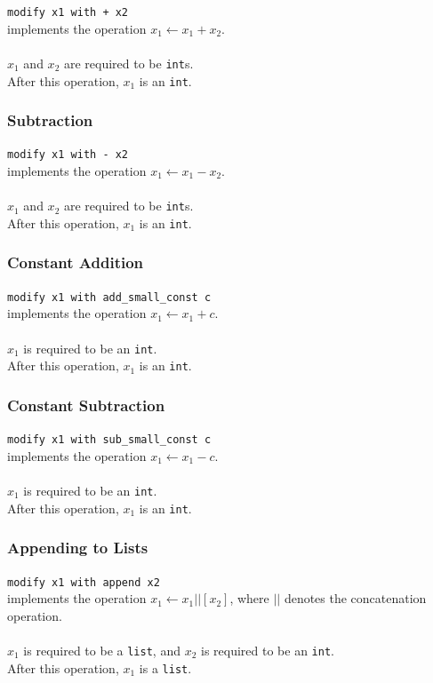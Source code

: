 \texttt{modify x1 with + x2} \\
implements the operation $x_1 \leftarrow x_1 + x_2$. \\ \\
$x_1$ and $x_2$ are required to be \texttt{int}s. \\
After this operation, $x_1$ is an \texttt{int}.

\subsubsection{Subtraction}

\texttt{modify x1 with - x2} \\
implements the operation $x_1 \leftarrow x_1 - x_2$. \\ \\
$x_1$ and $x_2$ are required to be \texttt{int}s. \\
After this operation, $x_1$ is an \texttt{int}.

\subsubsection{Constant Addition}

\texttt{modify x1 with add\_small\_const c} \\
implements the operation $x_1 \leftarrow x_1 + c$. \\ \\
$x_1$ is required to be an \texttt{int}. \\
After this operation, $x_1$ is an \texttt{int}.

\subsubsection{Constant Subtraction}

\texttt{modify x1 with sub\_small\_const c} \\
implements the operation $x_1 \leftarrow x_1 - c$. \\ \\
$x_1$ is required to be an \texttt{int}. \\
After this operation, $x_1$ is an \texttt{int}.

\subsubsection{Appending to Lists}

\texttt{modify x1 with append x2} \\
implements the operation $x_1 \leftarrow x_1 || [x_2]$, where $||$ denotes the concatenation operation. \\ \\
$x_1$ is required to be a \texttt{list}, and $x_2$ is required to be an \texttt{int}. \\
After this operation, $x_1$ is a \texttt{list}.

